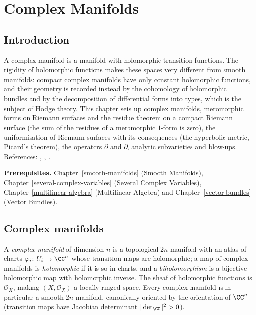 \chapter{Complex Manifolds}\label{complex-manifolds}

\section{Introduction}\label{complex-manifolds:section-introduction}

A complex manifold is a manifold with holomorphic transition functions. The rigidity of holomorphic functions makes these spaces
very different from smooth manifolds: compact complex manifolds have only constant holomorphic functions, and their geometry is
recorded instead by the cohomology of holomorphic bundles and by the decomposition of differential forms into types, which is the
subject of Hodge theory. This chapter sets up complex manifolds, meromorphic forms on Riemann surfaces and the residue theorem on a compact Riemann surface (the sum of the residues of a
meromorphic $1$-form is zero), the uniformisation of Riemann surfaces with its consequences (the hyperbolic metric, Picard's theorem),
the operators $\partial$ and $\bar\partial$, analytic subvarieties and
blow-ups. References: \cite[Chapter 0]{griffiths-harris}, \cite[Chapter 2]{huybrechts-complex},
\cite[Chapter 3]{voisin-hodge-1}.

\noindent\textbf{Prerequisites.} Chapter~\ref{smooth-manifolds} (Smooth Manifolds), Chapter~\ref{several-complex-variables} (Several
Complex Variables), Chapter~\ref{multilinear-algebra} (Multilinear Algebra) and Chapter~\ref{vector-bundles} (Vector Bundles).

\section{Complex manifolds}\label{complex-manifolds:section-manifolds}

\begin{definition}\label{complex-manifolds:definition-complex-manifold}
A \emph{complex manifold} of dimension $n$ is a topological $2n$-manifold with an atlas of charts $\varphi_i \colon U_i \to \CC^n$ whose transition maps are holomorphic; a map of complex manifolds is
\emph{holomorphic} if it is so in charts, and a \emph{biholomorphism} is a bijective holomorphic map with holomorphic inverse. The sheaf of holomorphic functions is $\mathcal{O}_X$, making $(X, \mathcal{O}_X)$ a
locally ringed space. Every complex manifold is in particular a smooth $2n$-manifold, canonically oriented by the orientation of $\CC^n$ (transition maps have Jacobian determinant $|\det_\CC|^2 > 0$).
\end{definition}

